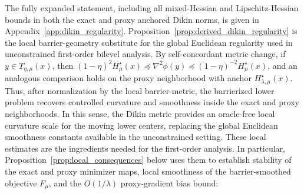\documentclass{article}
\begin{document}
The fully expanded statement, including all mixed-Hessian and Lipschitz-Hessian bounds in both the
exact and proxy anchored Dikin norms, is given in Appendix~\ref{app:dikin_regularity}.
Proposition~\ref{prop:derived_dikin_regularity} is the local barrier-geometry substitute for the
global Euclidean regularity used in unconstrained first-order bilevel analysis. By self-concordant
metric change, if \(y\in T_{\eta,\mu}(x)\), then
\((1-\eta)^2H_\mu^\star(x)\preceq\nabla^2\phi(y)\preceq(1-\eta)^{-2}H_\mu^\star(x)\), and an
analogous comparison holds on the proxy neighborhood with anchor \(H_{\lambda,\mu}^\star(x)\). Thus,
after normalization by the local barrier-metric, the barrierized lower problem recovers controlled
curvature and smoothness inside the exact and proxy neighborhoods. In this sense, the Dikin metric provides
an oracle-free local curvature scale for the moving lower centers, replacing the global Euclidean
smoothness constants available in the unconstrained setting. These local estimates are the ingredients needed for the first-order analysis. In particular,
Proposition~\ref{prop:local_consequences} below uses them to establish stability of the exact and
proxy minimizer maps, local smoothness of the barrier-smoothed objective \(F_\mu\), and the
\(O(1/\lambda)\) proxy-gradient bias bound:
\end{document}

